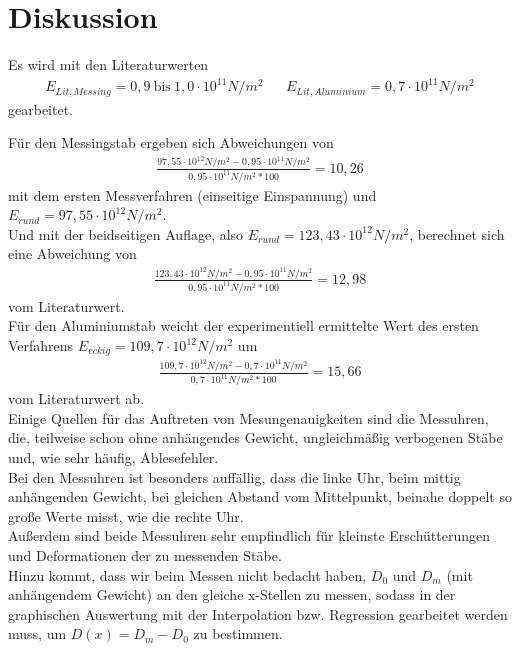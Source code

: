 \section{Diskussion}
\label{sec:Diskussion}



Es wird mit den Literaturwerten 
\begin{align*}
    E_{Lit, Messing} = 0,9 \: \textrm{bis} \: 1,0 \cdot 10^{11} N/m^2 && E_{Lit, Aluminium} = 0,7 \cdot 10^{11} N/m^2
\end{align*}
gearbeitet.

Für den Messingstab ergeben sich Abweichungen von 
\begin{align*}
    \frac{97,55 \cdot 10^{12} N/m^2 - 0,95 \cdot 10^{11} N/m^2}{0,95 \cdot 10^{11} N/m^2 * 100 } = 10,26
\end{align*}
mit dem ersten Messverfahren (einseitige Einspannung) und $E_{rund} = 97,55 \cdot 10^{12} N/m^2$.\\

Und mit der beidseitigen Auflage, also $E_{rund} = 123,43 \cdot 10^{12} N/m^2$, berechnet sich eine Abweichung von
\begin{align*}
    \frac{123,43 \cdot 10^{12} N/m^2 - 0,95 \cdot 10^{11} N/m^2}{0,95 \cdot 10^{11} N/m^2 * 100 } = 12,98
\end{align*}
vom Literaturwert.\\

Für den Aluminiumstab weicht der experimentiell ermittelte Wert des ersten Verfahrens $E_{eckig} = 109,7 \cdot 10^{12} N/m^2$ um
\begin{align*}
    \frac{109,7 \cdot 10^{12} N/m^2 - 0,7 \cdot 10^{11} N/m^2}{0,7 \cdot 10^{11} N/m^2 * 100 } = 15,66
\end{align*}
vom Literaturwert ab.\\

Einige Quellen für das Auftreten von Mesungenauigkeiten sind die Messuhren, die, teilweise 
schon ohne anhängendes Gewicht, ungleichmäßig verbogenen Stäbe und, wie sehr häufig, Ablesefehler.\\
Bei den Messuhren ist besonders auffällig, dass die linke Uhr, beim mittig anhängenden Gewicht, 
bei gleichen Abstand vom Mittelpunkt, beinahe doppelt so große Werte misst, wie die rechte Uhr.\\
Außerdem sind beide Messuhren sehr empfindlich für kleinste Erschütterungen und Deformationen der zu 
messenden Stäbe.\\
Hinzu kommt, dass wir beim Messen nicht bedacht haben, $D_0$ und $D_m$ (mit anhängendem Gewicht)
an den gleiche x-Stellen zu messen, sodass in der graphischen Auswertung mit der Interpolation 
bzw. Regression gearbeitet werden muss, um $D(x) = D_m - D_0$ zu bestimmen.